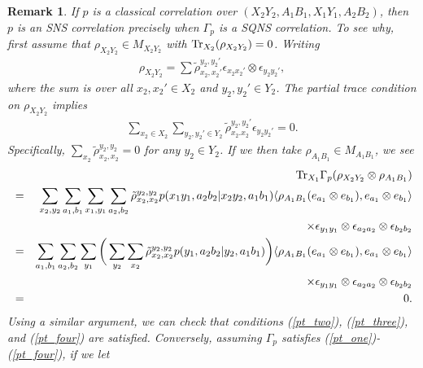 \documentclass[11pt]{amsart}
\newtheorem{remark}[theorem]{Remark}
\begin{document}
\begin{remark}\label{sns_vs_sqns}
\rm If $p$ is a classical correlation over $(X_{2}Y_{2}, A_{1}B_{1}, X_{1}Y_{1}, A_{2}B_{2})$, then $p$ is an SNS correlation precisely when $\Gamma_{p}$ is a SQNS correlation. To see why, first assume that $\rho_{X_{2}Y_{2}} \in M_{X_{2}Y_{2}}$ with ${\rm Tr}_{X_{2}}(\rho_{X_{2}Y_{2}}) = 0$. Writing
\begin{gather*}
	\rho_{X_{2}Y_{2}} = \sum \tilde{\rho}_{x_{2}, x_{2}'}^{y_{2}, y_{2}'}\epsilon_{x_{2}x_{2}'}\otimes \epsilon_{y_{2}y_{2}'},
\end{gather*}
\noindent where the sum is over all $x_{2}, x_{2}' \in X_{2}$ and $y_{2}, y_{2}' \in Y_{2}$. The partial trace condition on $\rho_{X_{2}Y_{2}}$ implies
\begin{gather}
	\sum\limits_{x_{2} \in X_{2}}\sum\limits_{y_{2}, y_{2}' \in Y_{2}}\tilde{\rho}_{x_{2}. x_{2}}^{y_{2}, y_{2}'}\epsilon_{y_{2}y_{2}'} = 0.
\end{gather}
Specifically, $\sum\limits_{x_{2}}\tilde{\rho}_{x_{2}, x_{2}}^{y_{2}, y_{2}} = 0$ for any $y_{2} \in Y_{2}$. If we then take $\rho_{A_{1}B_{1}} \in M_{A_{1}B_{1}}$, we see
\begin{eqnarray*}
& &
{\rm Tr}_{X_{1}}\Gamma_{p}(\rho_{X_{2}Y_{2}}\otimes \rho_{A_{1}B_{1}}) \\
& = &
\sum\limits_{x_{2}, y_{2}}\sum\limits_{a_{1}, b_{1}}\sum\limits_{x_{1}, y_{1}}\sum\limits_{a_{2}, b_{2}}\tilde{\rho}_{x_{2}, x_{2}}^{y_{2}, y_{2}}p(x_{1}y_{1}, a_{2}b_{2}|x_{2}y_{2}, a_{1}b_{1})\langle \rho_{A_{1}B_{1}}(e_{a_{1}}\otimes e_{b_{1}}), e_{a_{1}}\otimes e_{b_{1}}\rangle \\
& &
\;\;\;\;\;\;\;\; \times\epsilon_{y_{1}y_{1}}\otimes \epsilon_{a_{2}a_{2}}\otimes \epsilon_{b_{2}b_{2}} \\
& = &
\sum\limits_{a_{1}, b_{1}}\sum\limits_{a_{2}, b_{2}}\sum\limits_{y_{1}}\bigg(\sum\limits_{y_{2}}\sum\limits_{x_{2}}\tilde{\rho}_{x_{2}, x_{2}}^{y_{2}, y_{2}}p(y_{1}, a_{2}b_{2}|y_{2}, a_{1}b_{1})\bigg)\langle \rho_{A_{1}B_{1}}(e_{a_{1}}\otimes e_{b_{1}}), e_{a_{1}}\otimes e_{b_{1}}\rangle \\
& &
\;\;\;\;\;\;\;\; \times \epsilon_{y_{1}y_{1}}\otimes \epsilon_{a_{2}a_{2}}\otimes \epsilon_{b_{2}b_{2}} \\
& = &
0.
\end{eqnarray*}
Using a similar argument, we can check that conditions (\ref{pt_two}), (\ref{pt_three}), and (\ref{pt_four}) are satisfied.  Conversely, assuming $\Gamma_{p}$ satisfies (\ref{pt_one})-(\ref{pt_four}), if we let 

\end{remark}
\end{document}
